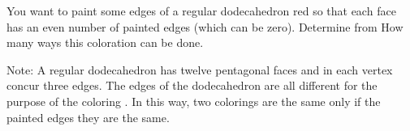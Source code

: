 You want to paint some edges of a regular dodecahedron red so that each face has an even number of painted edges (which can be zero). Determine from How many ways this coloration can be done.

Note: A regular dodecahedron has twelve pentagonal faces and in each vertex concur three edges. The edges of the dodecahedron are all different for the purpose of the coloring . In this way, two colorings are the same only if the painted edges they are the same.